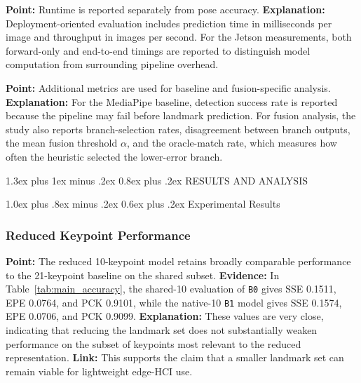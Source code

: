 \documentclass[10pt,letterpaper]{article}
\makeatletter
\renewcommand\section{\@startsection{section}{1}{\z@}%
  {1.3ex plus 1ex minus .2ex}%
  {0.8ex plus .2ex}%
  {\centering\normalfont\small\scshape}}
\renewcommand\subsection{\@startsection{subsection}{2}{\z@}%
  {1.0ex plus .8ex minus .2ex}%
  {0.6ex plus .2ex}%
  {\normalfont\itshape}}
\makeatother
\begin{document}
\medskip
\noindent\textbf{Point:} Runtime is reported separately from pose accuracy.  
\textbf{Explanation:} Deployment-oriented evaluation includes prediction time in milliseconds per image and throughput in images per second. For the Jetson measurements, both forward-only and end-to-end timings are reported to distinguish model computation from surrounding pipeline overhead.

\medskip
\noindent\textbf{Point:} Additional metrics are used for baseline and fusion-specific analysis.  
\textbf{Explanation:} For the MediaPipe baseline, detection success rate is reported because the pipeline may fail before landmark prediction. For fusion analysis, the study also reports branch-selection rates, disagreement between branch outputs, the mean fusion threshold $\alpha$, and the oracle-match rate, which measures how often the heuristic selected the lower-error branch.

\section{RESULTS AND ANALYSIS}

\subsection{Experimental Results}

\subsubsection{Reduced Keypoint Performance}

\noindent\textbf{Point:} The reduced 10-keypoint model retains broadly comparable performance to the 21-keypoint baseline on the shared subset.  
\textbf{Evidence:} In Table~\ref{tab:main_accuracy}, the shared-10 evaluation of \texttt{B0} gives SSE 0.1511, EPE 0.0764, and PCK 0.9101, while the native-10 \texttt{B1} model gives SSE 0.1574, EPE 0.0706, and PCK 0.9099.  
\textbf{Explanation:} These values are very close, indicating that reducing the landmark set does not substantially weaken performance on the subset of keypoints most relevant to the reduced representation.  
\textbf{Link:} This supports the claim that a smaller landmark set can remain viable for lightweight edge-HCI use.
\end{document}
